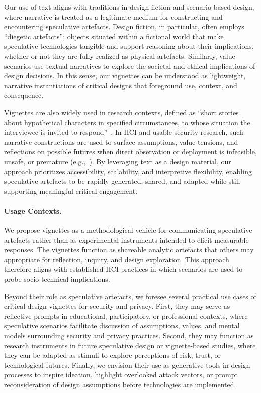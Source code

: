 Our use of text aligns with traditions in design fiction and scenario-based design, where narrative is treated as a legitimate medium for constructing and encountering speculative artefacts. Design fiction, in particular, often employs ``diegetic artefacts''; objects situated within a fictional world that make speculative technologies tangible and support reasoning about their implications, whether or not they are fully realized as physical artefacts. Similarly, value scenarios \cite{nathan2008envisioning} use textual narratives to explore the societal and ethical implications of design decisions. In this sense, our vignettes can be understood as lightweight, narrative instantiations of critical designs that foreground use, context, and consequence.

Vignettes are also widely used in research contexts, defined as ``short stories about hypothetical characters in specified circumstances, to whose situation the interviewee is invited to respond''~\cite{finch1987vignette}. In HCI and usable security research, such narrative constructions are used to surface assumptions, value tensions, and reflections on possible futures when direct observation or deployment is infeasible, unsafe, or premature (e.g.,~\cite{naeini2017privacy, hadan2024privacy}). By leveraging text as a design material, our approach prioritizes accessibility, scalability, and interpretive flexibility, enabling speculative artefacts to be rapidly generated, shared, and adapted while still supporting meaningful critical engagement.

\paragraph{Usage Contexts.} We propose vignettes as a methodological vehicle for communicating speculative artefacts rather than as experimental instruments intended to elicit measurable responses. The vignettes function as shareable analytic artefacts that others may appropriate for reflection, inquiry, and design exploration. This approach therefore aligns with established HCI practices in which scenarios are used to probe socio-technical implications. 

Beyond their role as speculative artefacts, we foresee several practical use cases of critical design vignettes for security and privacy. First, they may serve as reflective prompts in educational, participatory, or professional contexts, where speculative scenarios facilitate discussion of assumptions, values, and mental models surrounding security and privacy practices. Second, they may function as research instruments in future speculative design or vignette-based studies, where they can be adapted as stimuli to explore perceptions of risk, trust, or technological futures. Finally, we envision their use as generative tools in design processes to inspire ideation, highlight overlooked attack vectors, or prompt reconsideration of design assumptions before technologies are implemented.

